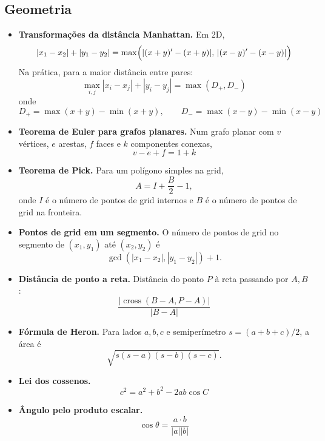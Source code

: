\subsection{Geometria}
\begin{itemize}[leftmargin=*,label={}]
	\ifextended
	\item \textbf{Transformações da distância Manhattan.}
		Em 2D,
		\[
			|x_1-x_2|+|y_1-y_2|
			= \max\Bigl(
			|(x+y)'-(x+y)|,\,
			|(x-y)'-(x-y)|
			\Bigr)
		\]
		Na prática, para a maior distância entre pares:
		\[
			\max_{i,j}|x_i-x_j|+|y_i-y_j| = \max(D_+, D_-)
		\]
		onde
		\[
			D_+ = \max(x+y)-\min(x+y),\qquad
			D_- = \max(x-y)-\min(x-y)
		\]
	\fi

	\item \textbf{Teorema de Euler para grafos planares.}
		Num grafo planar com $v$ vértices, $e$ arestas, $f$ faces e $k$ componentes conexas,
		\[
			v - e + f = 1 + k
		\]
	\item \textbf{Teorema de Pick.}
		Para um polígono simples na grid,
		\[
			A = I + \frac{B}{2} - 1,
		\]
		onde $I$ é o número de pontos de grid internos e $B$ é o número de pontos de grid na fronteira.

	\ifextended
	\item \textbf{Pontos de grid em um segmento.}
		O número de pontos de grid no segmento de $(x_1,y_1)$ até $(x_2,y_2)$ é
		\[
			\gcd(|x_1-x_2|, |y_1-y_2|) + 1.
		\]
	\fi

		\ifextended
	\item \textbf{Distância de ponto a reta.}
		Distância do ponto $P$ à reta passando por $A,B$:
		\[
			\frac{|\operatorname{cross}(B-A,P-A)|}{|B-A|}
		\]
		\fi

	\item \textbf{Fórmula de Heron.}
		Para lados $a,b,c$ e semiperímetro $s=(a+b+c)/2$, a área é
		\[
			\sqrt{s(s-a)(s-b)(s-c)}.
		\]

		\ifextended
	\item \textbf{Lei dos cossenos.}
		\[
			c^2=a^2+b^2-2ab\cos C
		\]
		\fi

		\ifextended
	\item \textbf{Ângulo pelo produto escalar.}
		\[
			\cos\theta = \frac{a\cdot b}{|a||b|}
		\]
		\fi


\end{itemize}
